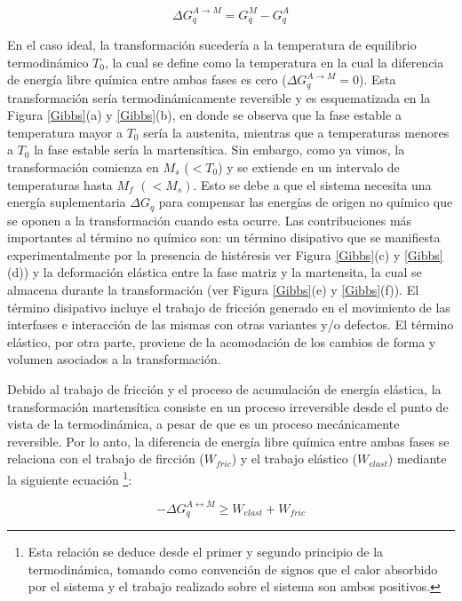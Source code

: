 \documentclass[12pt]{article}
\theoremstyle{definition}
\theoremstyle{remark}
\begin{document}
\begin{equation}
\Delta G^{A \rightarrow M}_q = G^M_q - G^A_q
\end{equation} 

En el caso ideal, la transformación sucedería a la temperatura de equilibrio termodinámico $T_0$, la cual se define como la temperatura en la cual la diferencia de energía libre química entre ambas fases es cero ($\Delta G^{A \rightarrow M}_q = 0$). Esta transformación sería termodinámicamente reversible y es esquematizada en la Figura \ref{Gibbs}(a) y \ref{Gibbs}(b), en donde se observa que la fase estable a temperatura mayor a $T_0$ sería la austenita, mientras que a temperaturas menores a $T_0$ la fase estable sería la martensítica. Sin embargo, como ya vimos, la transformación comienza en $M_s$  ($< T_0$) y se extiende en un intervalo de temperaturas hasta $M_f$  $(< M_s)$. Esto se debe a que el sistema necesita una energía suplementaria $\Delta G_q$ para compensar las energías de origen no químico que se oponen a la transformación cuando esta ocurre. Las contribuciones más importantes al término no químico son: un término disipativo que se manifiesta experimentalmente por la presencia de histéresis ver Figura \ref{Gibbs}(c) y \ref{Gibbs}(d)) y la deformación elástica entre la fase matriz y la martensita, la cual se almacena durante la transformación (ver Figura \ref{Gibbs}(e) y \ref{Gibbs}(f)). El término disipativo incluye el trabajo de fricción generado en el movimiento de las interfases e interacción de las mismas con otras variantes y/o defectos. El término elástico, por otra parte, proviene de la acomodación de los cambios de forma y volumen asociados a la transformación\cite{Wollants1993}.

Debido al trabajo de fricción y el proceso de acumulación de energía elástica, la transformación martensítica consiste en un proceso irreversible desde el punto de vista de la termodinámica, a pesar de que es un proceso mecánicamente reversible. Por lo anto, la diferencia de energía libre química entre ambas fases se relaciona con el trabajo de fircción ($W_{fric}$) y el trabajo elástico ($W_{elast}$) mediante la siguiente ecuación \footnote{Esta relación se deduce desde el primer y segundo principio de la termodinámica, tomando como convención de signos que el calor absorbido por el sistema y el trabajo realizado sobre el sistema son ambos positivos.}\cite{Isola2020}:

\begin{equation}
\label{GibbsEnergyEquation}
	- \Delta G_{q}^{A \leftrightarrow M} \geq W_{elast} + W_{fric}
\end{equation}
\end{document}
